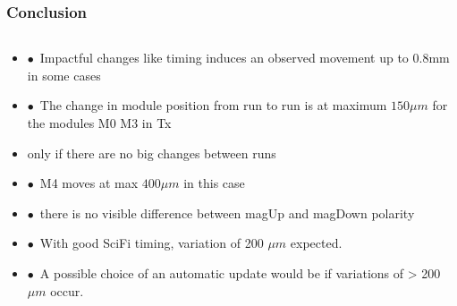 \documentclass[aspectratio=1610, 12pt, xcolor=dvipsnames]{beamer}
\begin{document}
\begin{frame}\frametitle{Conclusion}
  \begin{columns}
    \begin{column}[c]{\textwidth}
      \begin{itemize}
        \item $\bullet$\, Impactful changes like timing induces an observed movement up to 0.8mm in some cases
        \item $\bullet$\, The change in module position from run to run is at maximum $150 \mu m$ for the modules M0 \to M3 in Tx
        \item \to only if there are no big changes between runs
        \item $\bullet$\, M4 moves at max $400 \mu m$ in this case
        \item $\bullet$\, there is no visible difference between magUp and magDown polarity
        \item $\bullet$\, With good SciFi timing, variation of 200 $\mu m$ expected.
        \item $\bullet$\, A possible choice of an automatic update would be if variations of > 200 $\mu m$ occur.
      \end{itemize}
    \end{column}
  \end{columns}
\end{frame}
\end{document}
